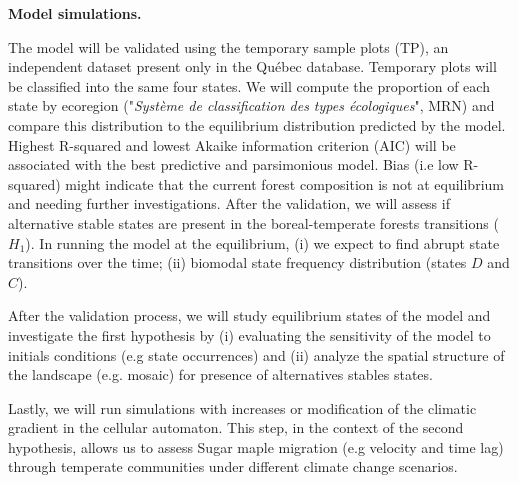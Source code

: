 \textbf{Model simulations.} 

The model will be validated using the temporary sample plots (TP), an independent
dataset present only in the Québec database. Temporary plots will be
classified into the same four states. We will compute the proportion of each
state by ecoregion ("\textit{Système de classification des types
écologiques}", MRN) and compare this distribution to the equilibrium distribution predicted by the model.  Highest R-squared and lowest Akaike information criterion
(AIC) will be associated with the best predictive and parsimonious model. Bias
(i.e low R-squared) might indicate that the current forest composition is not
at equilibrium and needing further investigations. After the validation, we
will assess if alternative stable states are present in the boreal-temperate
forests transitions ($H_1$). In running the model at the equilibrium, (i)  we
expect to find abrupt state transitions over the time; (ii) biomodal state
frequency distribution (states $D$ and $C$).
 

After the validation process, we will study equilibrium states of the model
and investigate the first hypothesis by (i) evaluating the sensitivity of the model to 
initials conditions (e.g state occurrences) and (ii) analyze the spatial
structure of the landscape (e.g. mosaic) for presence of alternatives stables
states. 


Lastly, we will run simulations with increases or modification of the
climatic gradient in the cellular automaton. This step, in the context of the
second hypothesis, allows us to assess Sugar maple migration (e.g velocity and
time lag) through  temperate communities under different climate change
scenarios.


\clearpage
\small

